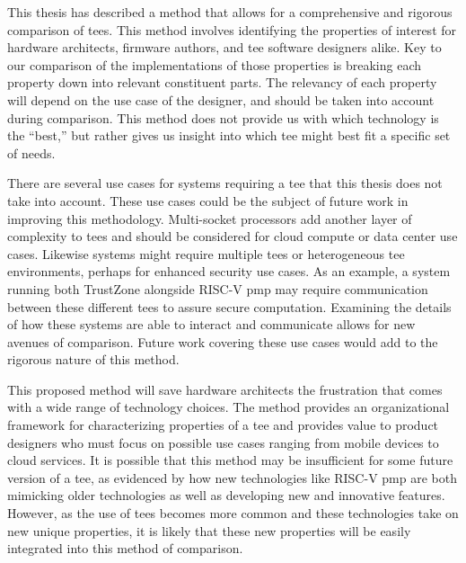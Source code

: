 This thesis has described a method that allows for a comprehensive and rigorous comparison of \glspl{tee}. This method involves identifying the properties of interest for hardware architects, firmware authors, and \gls{tee} software designers alike. Key to our comparison of the implementations of those properties is breaking each property down into relevant constituent parts. The relevancy of each property will depend on the use case of the designer, and should be taken into account during comparison. This method does not provide us with which technology is the ``best,'' but rather gives us insight into which \gls{tee} might best fit a specific set of needs.

There are several use cases for systems requiring a \gls{tee} that this thesis does not take into account. These use cases could be the subject of future work in improving this methodology. Multi-socket processors \cite{knauth2018integrating} add another layer of complexity to \glspl{tee} and should be considered for cloud compute or data center use cases. Likewise systems might require multiple \glspl{tee} or heterogeneous \gls{tee} environments, perhaps for enhanced security use cases. As an example, a system running both TrustZone alongside RISC-V \gls{pmp} may require communication between these different \glspl{tee} to assure secure computation. Examining the details of how these systems are able to interact and communicate allows for new avenues of comparison. Future work covering these use cases would add to the rigorous nature of this method. 

This proposed method will save hardware architects the frustration that comes with a wide range of technology choices. The method provides an organizational framework for characterizing properties of a \gls{tee} and provides value to product designers who must focus on possible use cases ranging from mobile devices to cloud services. It is possible that this method may be insufficient for some future version of a \gls{tee}, as evidenced by how new technologies like RISC-V \gls{pmp} are both mimicking older technologies as well as developing new and innovative features. However, as the use of \glspl{tee} becomes more common and these technologies take on new unique properties, it is likely that these new properties will be easily integrated into this method of comparison.